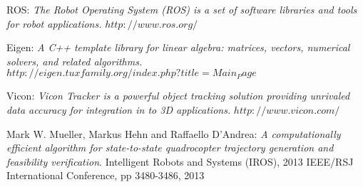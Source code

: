 \begin{thebibliography}{99}
 {\sc ROS}: 
{\it The Robot Operating System (ROS) is a set of software libraries and tools for robot applications.}\newline
\href{http://www.ros.org/}{$http://www.ros.org/$}

 {\sc Eigen}: 
{\it  A C++ template library for linear algebra: matrices, vectors, numerical solvers, and related algorithms.}\newline
\href{http://eigen.tuxfamily.org/index.php?title=Main_Page}{$http://eigen.tuxfamily.org/index.php?title=Main_Page$}

 {\sc Vicon}: 
{\it Vicon Tracker is a powerful object tracking solution providing unrivaled data accuracy for integration in to 3D applications.}\newline
\href{http://www.vicon.com/}{$http://www.vicon.com/$}

 {\sc Mark W. Mueller, Markus Hehn and Raffaello D'Andrea}: 
{\it A computationally efficient algorithm for state-to-state quadrocopter trajectory generation and feasibility verification}.
Intelligent Robots and Systems (IROS), 2013 IEEE/RSJ International Conference, pp 3480-3486, 2013


\end{thebibliography}
